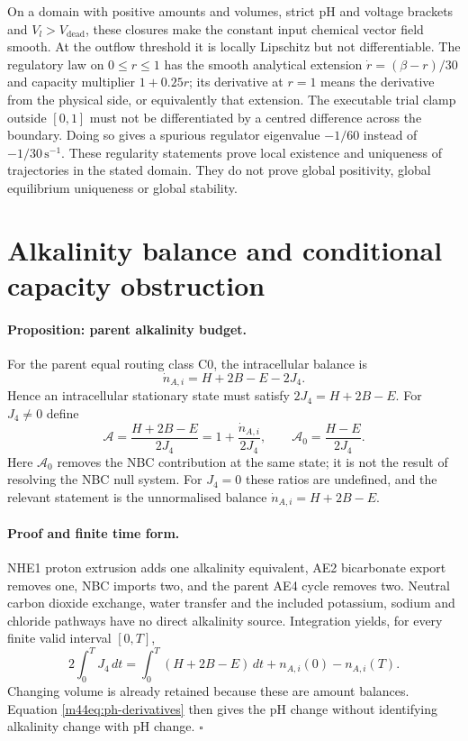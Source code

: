 On a domain with positive amounts and volumes, strict pH and voltage
brackets and $V_l>V_{\mathrm{dead}}$, these closures make the constant input
chemical vector field smooth.  At the outflow threshold it is locally
Lipschitz but not differentiable.  The regulatory law on $0\leq r\leq1$
has the smooth analytical extension $\dot r=(\beta-r)/30$ and
capacity multiplier $1+0.25r$; its derivative at $r=1$ means the derivative
from the physical side, or equivalently that extension.  The executable
trial clamp outside $[0,1]$ must not be differentiated by a centred
difference across the boundary.  Doing so gives a spurious regulator
eigenvalue $-1/60$ instead of $-1/30\,\mathrm{s}^{-1}$.
These regularity statements prove local existence and uniqueness of
trajectories in the stated domain.  They do not prove global positivity,
global equilibrium uniqueness or global stability.

\section{Alkalinity balance and conditional capacity obstruction}
\label{m44sec:alkalinity-proof}
\paragraph{Proposition: parent alkalinity budget.}
For the parent equal routing class C0, the intracellular balance is
\begin{equation}
 \dot n_{A,i}=H+2B-E-2J_4.
 \label{m44eq:alkalinity-budget}
\end{equation}
Hence an intracellular stationary state must satisfy
$2J_4=H+2B-E$.  For $J_4\ne0$ define
\[
 \mathcal A=\frac{H+2B-E}{2J_4}
       =1+\frac{\dot n_{A,i}}{2J_4},\qquad
 \mathcal A_0=\frac{H-E}{2J_4}.
\]
Here $\mathcal A_0$ removes the NBC contribution at the same state; it is
not the result of resolving the NBC null system.  For $J_4=0$ these ratios
are undefined, and the relevant statement is the unnormalised balance
$\dot n_{A,i}=H+2B-E$.

\paragraph{Proof and finite time form.}
NHE1 proton extrusion adds one alkalinity equivalent, AE2 bicarbonate
export removes one, NBC imports two, and the parent AE4 cycle removes two.
Neutral carbon dioxide exchange, water transfer and the included potassium,
sodium and chloride pathways have no direct alkalinity source.
Integration yields, for every finite valid interval $[0,T]$,
\begin{equation}
 2\int_0^T J_4\,dt=\int_0^T(H+2B-E)\,dt
                         +n_{A,i}(0)-n_{A,i}(T).
 \label{m44eq:alkalinity-integrated}
\end{equation}
Changing volume is already retained because these are amount balances.
Equation \eqref{m44eq:ph-derivatives} then gives the pH change without
identifying alkalinity change with pH change. $\square$

